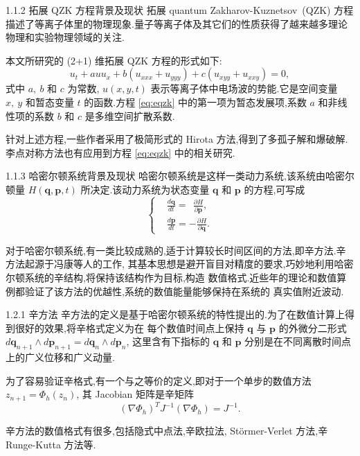 \documentclass{beamer}
\begin{document}
\begin{frame}{1.1.2 拓展 QZK 方程背景及现状}
\qquad 拓展 quantum Zakharov-Kuznetsov~(QZK) 方程描述了等离子体里的物理现象.量子等离子体及其它们的性质获得了越来越多理论物理和实验物理领域的关注.

\qquad 本文所研究的 (2+1) 维拓展 QZK 方程的形式如下:
\begin{equation}\label{eq:eqzk}
u_{t}+auu_{x}+b(u_{xxx}+u_{yyy})+c(u_{xyy}+u_{xxy})=0,
\end{equation}
式中 $a,~b$ 和 $c$ 为常数, $u(x, y, t)$ 表示等离子体中电场波的势能.它是空间变量 $x,~y$ 和暂态变量 $t$ 的函数.方程 \eqref{eq:eqzk} 中的第一项为暂态发展项,系数 $a$ 和非线性项的系数 $b$ 和 $c$ 是多维空间扩散系数.

\qquad 针对上述方程,一些作者采用了极简形式的 Hirota 方法,得到了多孤子解和爆破解. 李点对称方法也有应用到方程 \eqref{eq:eqzk} 中的相关研究.
\end{frame}

\begin{frame}{1.1.3 哈密尔顿系统背景及现状}
\qquad 哈密尔顿系统是这样一类动力系统,该系统由哈密尔顿量 ${\displaystyle H({\boldsymbol {q}},{\boldsymbol {p}},t)}$ 所决定.该动力系统为状态变量 $\boldsymbol {q}$ 和 $\boldsymbol {p}$ 的方程,可写成
\begin{equation}\label{eq:hamiltonian}
\left\lbrace
\begin{aligned}
&{\frac {d{\boldsymbol {q}}}{dt}}=~~{\frac {\partial H}{\partial {\boldsymbol {p}}}},\\
&{\frac {d{\boldsymbol {p}}}{dt}}=-{\frac {\partial H}{\partial {\boldsymbol {q}}}}.
\end{aligned}
\right.
\end{equation}

\qquad 对于哈密尔顿系统,有一类比较成熟的,适于计算较长时间区间的方法,即辛方法.辛方法起源于冯康等人的工作, 其基本思想是避开盲目对精度的要求,巧妙地利用哈密尔顿系统的辛结构,将保持该结构作为目标,构造
数值格式.近些年的理论和数值算例都验证了该方法的优越性,系统的数值能量能够保持在系统的
真实值附近波动.
\end{frame}

\begin{frame}{1.2.1 辛方法}
\qquad 辛方法的定义是基于哈密尔顿系统的特性提出的.为了在数值计算上得到很好的效果,将辛格式定义为在
每个数值时间点上保持 $\boldsymbol {q}$ 与 $\boldsymbol {p}$ 的外微分二形式 $d\boldsymbol {q}_{n+1}\wedge d\boldsymbol {p}_{n+1}=d\boldsymbol {q}_n\wedge d\boldsymbol {p}_n$, 这里含有下指标的 $\boldsymbol {q}$ 和 $\boldsymbol {p}$
分别是在不同离散时间点上的广义位移和广义动量.

\qquad 为了容易验证辛格式,有一个与之等价的定义,即对于一个单步的数值方法 $z_{n+1}=\Phi_h(z_n)$, 其 Jacobian 矩阵是辛矩阵 
\begin{equation*}
(\nabla\Phi_h)^TJ^{-1}(\nabla\Phi_h)=J^{-1}.
\end{equation*}

\qquad 辛方法的数值格式有很多,包括隐式中点法,辛欧拉法, St\"{o}rmer-Verlet 方法,辛 Runge-Kutta 方法等.
\end{frame}
\end{document}
